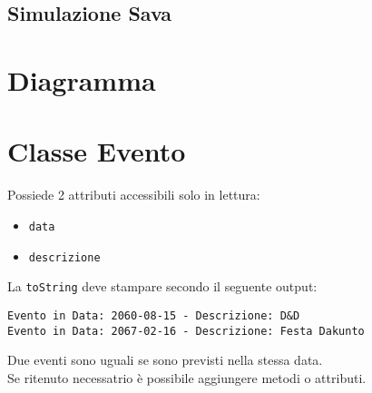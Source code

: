 \documentclass[12pt, a4paper]{article}
\begin{document}
	\begin{center}
		\section*{Simulazione Sava}
	\end{center}
	
	\section{Diagramma}
	
	
	\vspace{-.5cm}
	\section{Classe Evento}
	Possiede 2 attributi accessibili solo in lettura:
	\begin{itemize}[noitemsep, topsep=3pt]
		\item \texttt{data}
		\item \texttt{descrizione}
	\end{itemize}
	La \texttt{toString} deve stampare secondo il seguente output:
	\begin{tcolorbox}
		\texttt{Evento in Data: 2060-08-15 - Descrizione: D\&D\\
		Evento in Data: 2067-02-16 - Descrizione: Festa Dakunto}
	\end{tcolorbox}
	Due eventi sono uguali se sono previsti nella stessa data.\\
	Se ritenuto necessatrio è possibile aggiungere metodi o attributi.
	
\end{document}
